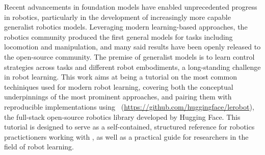 Recent advancements in foundation models have enabled unprecedented progress in robotics, particularly in the development of increasingly more capable generalist robotics models.
Leveraging modern learning-based approaches, the robotics community produced the first general models for tasks including locomotion and manipulation, and many said results have been openly released to the open-source community.
The premise of generalist models is to learn control strategies across tasks and different robot embodiments, a long-standing challenge in robot learning.
This work aims at being a tutorial on the most common techiniques used for modern robot learning, covering both the conceptual underpinnings of the most prominent approaches, and pairing them with reproducible implementations using \lerobot \ (\url{https://github.com/huggingface/lerobot}), the full-stack open-source robotics library developed by Hugging Face.
This tutorial is designed to serve as a self-contained, structured reference for robotics practictioners working with \lerobot, as well as a practical guide for researchers in the field of robot learning.